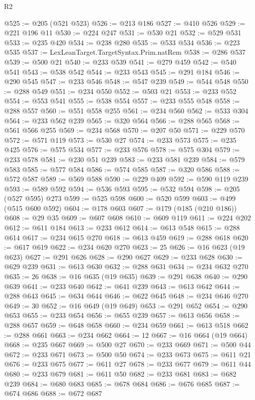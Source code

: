\begin{lexlean}{R2}
\begin{coremodule}
@525 := @205 (@521 @523)
@526 := @213 @186
@527 := @410 @526
@529 := @221 @196 @11
@530 := @224 @247
@531 := @530 @21
@532 := @529 @531
@533 := @235 @420
@534 := @238 @280
@535 := @533 @534
@536 := @223 @535
@537 := LexLeanTarget.TargetSyntax.Prim.natRem
@538 := @286 @537
@539 := @500 @21
@540 := @233 @539
@541 := @279 @459
@542 := @540 @541
@543 := @538 @542
@544 := @233 @543
@545 := @291 @184
@546 := @290 @545
@547 := @233 @546
@548 := @547 @239
@549 := @544 @548
@550 := @288 @549
@551 := @234 @550
@552 := @503 @21
@553 := @233 @552
@554 := @553 @541
@555 := @538 @554
@557 := @233 @555 @548
@558 := @288 @557
@560 := @551 @558 @255
@561 := @234 @560
@562 := @533 @304
@564 := @233 @562 @239
@565 := @320 @564
@566 := @288 @565
@568 := @561 @566 @255
@569 := @234 @568
@570 := @207 @50
@571 := @229 @570
@572 := @571 @119
@573 := @530 @27
@574 := @233 @573
@575 := @235 @425
@576 := @575 @534
@577 := @233 @576
@578 := @575 @304
@579 := @233 @578
@581 := @230 @51 @239
@583 := @233 @581 @239
@584 := @579 @583
@585 := @577 @584
@586 := @574 @585
@587 := @320 @586
@588 := @572 @587
@589 := @569 @588
@590 := @229 @409
@592 := @590 @119 @239
@593 := @589 @592
@594 := @536 @593
@595 := @532 @594
@598 := @205 (@527 @595) @273
@599 := @525 @598
@600 := @520 @599
@603 := @499 (@515 @600 @592)
@604 := @178 @603
@607 := @179 (@185 (@210 @186))
@608 := @29 @35
@609 := @607 @608
@610 := @609 @119
@611 := @224 @202
@612 := @611 @184
@613 := @233 @612
@614 := @613 @548
@615 := @288 @614
@617 := @234 @615 @270
@618 := @613 @459
@619 := @288 @618
@620 := @617 @619
@622 := @234 @620 @270
@623 := 25
@626 := @16 @623 (@19 @623)
@627 := @291 @626
@628 := @290 @627
@629 := @233 @628
@630 := @629 @239
@631 := @613 @630
@632 := @288 @631
@634 := @234 @632 @270
@635 := 26
@638 := @16 @635 (@19 @635)
@639 := @291 @638
@640 := @290 @639
@641 := @233 @640
@642 := @641 @239
@643 := @613 @642
@644 := @288 @643
@645 := @634 @644
@646 := @622 @645
@648 := @234 @646 @270
@649 := 30
@652 := @16 @649 (@19 @649)
@653 := @291 @652
@654 := @290 @653
@655 := @233 @654
@656 := @655 @239
@657 := @613 @656
@658 := @288 @657
@659 := @648 @658
@660 := @234 @659
@661 := @613 @518
@662 := @288 @661
@663 := @234 @662
@664 := 12
@667 := @16 @664 (@19 @664)
@668 := @235 @667
@669 := @500 @27
@670 := @233 @669
@671 := @500 @44
@672 := @233 @671
@673 := @500 @50
@674 := @233 @673
@675 := @611 @21
@676 := @233 @675
@677 := @611 @27
@678 := @233 @677
@679 := @611 @44
@680 := @233 @679
@681 := @611 @50
@682 := @233 @681
@683 := @682 @239
@684 := @680 @683
@685 := @678 @684
@686 := @676 @685
@687 := @674 @686
@688 := @672 @687

\end{coremodule}
\end{lexlean}
